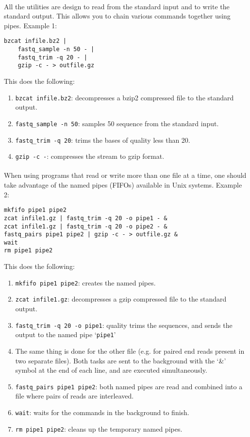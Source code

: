 \documentclass[a4paper,12pt]{article}
\begin{document}
\paragraph{}
All the utilities are design to read from the standard input and to write the
standard output.
This allows you to chain various commands together using pipes.
Example 1:
\begin{verbatim}
bzcat infile.bz2 |
    fastq_sample -n 50 - |
    fastq_trim -q 20 - |
    gzip -c - > outfile.gz
\end{verbatim}
This does the following:
\begin{enumerate}
    \item \texttt{bzcat infile.bz2}: decompresses a bzip2 compressed file to
        the standard output.
    \item \texttt{fastq\_sample -n 50}: samples 50 sequence from the standard
        input.
    \item \texttt{fastq\_trim -q 20}: trims the bases of quality less than 20.
    \item \texttt{gzip -c -}: compresses the stream to gzip format.
\end{enumerate}

\paragraph{}
When using programs that read or write more than one file at a time, one should take
advantage of the named pipes (FIFOs) available in Unix systems.
Example 2:
\begin{verbatim}
mkfifo pipe1 pipe2
zcat infile1.gz | fastq_trim -q 20 -o pipe1 - &
zcat infile1.gz | fastq_trim -q 20 -o pipe2 - &
fastq_pairs pipe1 pipe2 | gzip -c - > outfile.gz &
wait
rm pipe1 pipe2
\end{verbatim}
This does the following:
\begin{enumerate}
    \item \texttt{mkfifo pipe1 pipe2}: creates the named pipes.
    \item \texttt{zcat infile1.gz}: decompresses a gzip compressed file to the
        standard output.
    \item \texttt{fastq\_trim -q 20 -o pipe1}: quality trims the sequences, and
        sends the output to the named pipe `\texttt{pipe1}'
    \item The same thing is done for the other file (e.g. for paired end reads
        present in two separate files).  Both tasks are sent to the background
        with the `\&' symbol at the end of each line, and are executed
        simultaneously.
    \item \texttt{fastq\_pairs pipe1 pipe2}: both named pipes are read and
        combined into a file where pairs of reads are interleaved.
    \item \texttt{wait}: waits  for the commands in the background to finish.
    \item \texttt{rm pipe1 pipe2}: cleans up the temporary named pipes.
\end{enumerate}
\end{document}
